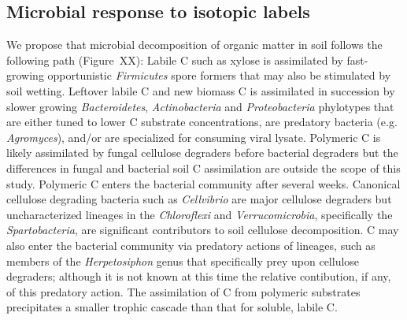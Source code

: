 \subsection{Microbial response to isotopic labels}
We propose that microbial decomposition of organic matter in soil follows the
following path (Figure~XX): Labile C such as xylose is assimilated by
fast-growing opportunistic \textit{Firmicutes} spore formers that may also be
stimulated by soil wetting. Leftover labile C and new biomass C is assimilated
in succession by slower growing \textit{Bacteroidetes}, \textit{Actinobacteria}
and \textit{Proteobacteria} phylotypes that are either tuned to lower C substrate
concentrations, are predatory bacteria (e.g. \textit{Agromyces}), and/or are
specialized for consuming viral lysate. Polymeric C is likely assimilated by
fungal cellulose degraders before bacterial degraders but the differences in
fungal and bacterial soil C assimilation are outside the scope of this study.
Polymeric C enters the bacterial community after several weeks. Canonical
cellulose degrading bacteria such as \textit{Cellvibrio} are major cellulose
degraders but uncharacterized lineages in the \textit{Chloroflexi} and
\textit{Verrucomicrobia}, specifically the \textit{Spartobacteria}, are
significant contributors to soil cellulose decomposition. C may also enter the bacterial community via predatory
actions of lineages, such as members of the \textit{Herpetosiphon} genus that specifically prey upon cellulose degraders; although it is not known at
this time the relative contibution, if any, of this predatory action. The
assimilation of C from polymeric substrates precipitates a smaller trophic
cascade than that for soluble, labile C.


